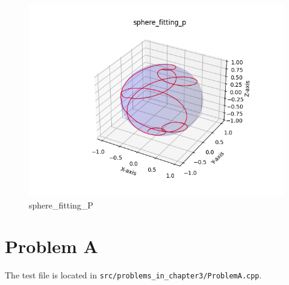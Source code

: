 \documentclass[a4paper]{article}
\begin{document}
    \begin{figure}[H]
    \centering
    \includegraphics{../figure/sphere_fitting_P.png}
    \caption{sphere\_fitting\_P}
    \end{figure}

\section*{Problem A}
    The test file is located in \texttt{src/problems\_in\_chapter3/ProblemA.cpp}.
    
\end{document}
